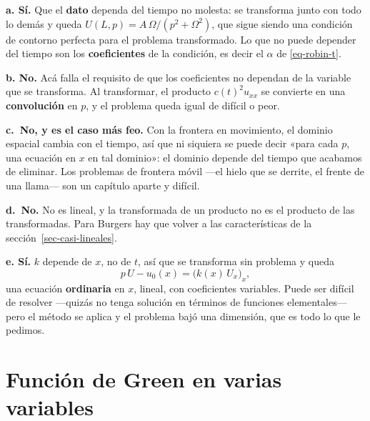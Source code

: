 \documentclass[
  spanish,
  a4paper,
]{scrbook}
\theoremstyle{definition}
\theoremstyle{plain}
\theoremstyle{definition}
\theoremstyle{plain}
\theoremstyle{definition}
\theoremstyle{remark}
\begin{document}
\begin{tcolorbox}[enhanced jigsaw, arc=.35mm, bottomrule=.15mm, bottomtitle=1mm, breakable, colback=white, colbacktitle=quarto-callout-tip-color!10!white, colframe=quarto-callout-tip-color-frame, coltitle=black, left=2mm, leftrule=.75mm, opacityback=0, opacitybacktitle=0.6, rightrule=.15mm, title=\textcolor{quarto-callout-tip-color}{\faLightbulb}\hspace{0.5em}{Solución}, titlerule=0mm, toprule=.15mm, toptitle=1mm]

\textbf{a. Sí.} Que el \textbf{dato} dependa del tiempo no molesta: se
transforma junto con todo lo demás y queda
\(U(L,p) = A\,\Omega/(p^2+\Omega^2)\), que sigue siendo una condición de
contorno perfecta para el problema transformado. Lo que no puede
depender del tiempo son los \textbf{coeficientes} de la condición, es
decir el \(\alpha\) de \ref{eq-robin-t}.

\textbf{b. No.} Acá falla el requisito de que los coeficientes no
dependan de la variable que se transforma. Al transformar, el producto
\(c(t)^2u_{xx}\) se convierte en una \textbf{convolución} en \(p\), y el
problema queda igual de difícil o peor.

\textbf{c.~No, y es el caso más feo.} Con la frontera en movimiento, el
dominio espacial cambia con el tiempo, así que ni siquiera se puede
decir «para cada \(p\), una ecuación en \(x\) en tal dominio»: el
dominio depende del tiempo que acabamos de eliminar. Los problemas de
frontera móvil ---el hielo que se derrite, el frente de una llama--- son
un capítulo aparte y difícil.

\textbf{d.~No.} No es lineal, y la transformada de un producto no es el
producto de las transformadas. Para Burgers hay que volver a las
características de la sección~\ref{sec-casi-lineales}.

\textbf{e. Sí.} \(k\) depende de \(x\), no de \(t\), así que se
transforma sin problema y queda
\[p\,U - u_0(x) = \big(k(x)\,U_x\big)_x ,\] una ecuación
\textbf{ordinaria} en \(x\), lineal, con coeficientes variables. Puede
ser difícil de resolver ---quizás no tenga solución en términos de
funciones elementales--- pero el método se aplica y el problema bajó una
dimensión, que es todo lo que le pedimos.

\end{tcolorbox}

\section{Función de Green en varias variables}\label{sec-green-varias}
\end{document}
